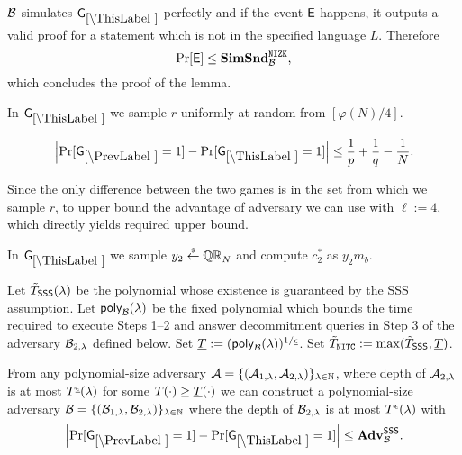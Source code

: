 $\mathcal{B}$ simulates $\games_\thisgame$ perfectly and if the event $\mathsf{E}$ happens, it outputs a valid proof for a statement which is not in the specified language $L$. Therefore
\[\Pr[\mathsf{E}] \leq \mathbf{SimSnd}^{\mathtt{NIZK}}_{\mathcal{B}},\]
which concludes the proof of the lemma.  


In $\games_\thisgame$ we sample $r$ uniformly at random from $[\varphi(N)/4]$. 

\begin{lemma}
\[
\left|\Pr[\games_\prevgame = 1] - \Pr[\games_\thisgame = 1]\right| \leq \frac{1}{p}+\frac{1}{q}-\frac{1}{N}.
\]
\end{lemma}
Since the only difference between the two games is in the set from which we sample $r$, to upper bound the advantage of adversary we can use  with $\ell:=4$, which directly yields required upper bound.

%


In $\games_\thisgame$ we sample $y_2 \stackrel{{\scriptscriptstyle\$}}{\leftarrow} \mathbb{QR}_N$ and compute $c_2^*$ as $y_2 m_b$.

Let $\tilde{T}_\mathsf{SSS}(\lambda)$ be the polynomial whose existence is guaranteed by the SSS assumption.
Let $\mathsf{poly}_{\mathcal{B}}(\lambda)$ be the fixed polynomial which bounds the time required to execute Steps 1--2 and answer decommitment queries in Step 3 of the adversary $\mathcal{B}_{2, \lambda}$ defined below. Set $\underline{T} := (\mathsf{poly}_{\mathcal{B}}(\lambda))^{1 / \underline{\epsilon}}$.  Set $\tilde{T}_{\mathtt{NITC}} := \max(\tilde{T}_\mathsf{SSS}, \underline{T})$.
\begin{lemma}
From any polynomial-size adversary $\mathcal{A} = \{(\mathcal{A}_{1,\lambda}, \mathcal{A}_{2, \lambda})\}_{\lambda \in \mathbb{N}}$, where depth of $\mathcal{A}_{2, \lambda}$ is at most $T^{\underline{\epsilon}}(\lambda)$ for some $T(\cdot) \geq \underline{T}(\cdot)$ we can construct a polynomial-size adversary $\mathcal{B} = \{(\mathcal{B}_{1,\lambda}, \mathcal{B}_{2, \lambda})\}_{\lambda \in \mathbb{N}}$ where the depth of $\mathcal{B}_{2, \lambda}$ is at most $T^{\epsilon}(\lambda)$ with
\[
\left|\Pr[\games_\prevgame = 1] - \Pr[\games_\thisgame = 1]\right| \leq \advtg_\advB^\sss.
\]
\end{lemma}

